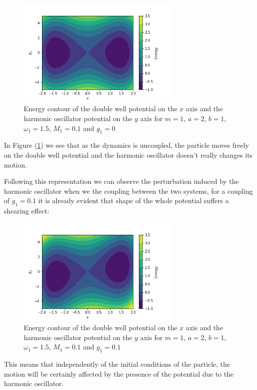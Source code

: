 \begin{figure}[H]
\centering
\includegraphics[width=0.7\textwidth]{Figures/energy_contour.png}
\caption{Energy contour of the double well potential on the $x$ axis and the harmonic oscillator potential on the $y$ axis for $m=1$, $a=2$, $b=1$, $\omega_1=1.5$, $M_1=0.1$ and $g_1=0$}
\label{fig:contour_g0}
\end{figure}

In Figure (\ref{fig:contour_g0}) we see that as the dynamics is uncoupled, the particle moves freely on the double well potential and the harmonic oscillator doesn't really changes its motion. \par 

Following this representation we can observe the perturbation induced by the harmonic oscillator when we  the coupling between the two systems, for a coupling of $g_1=0.1$ it is already evident that shape of the whole potential suffers a shearing effect:

\begin{figure}[H]
\centering
\includegraphics[width=0.7\textwidth]{Figures/energy_contour_coupled01.png}
\caption{Energy contour of the double well potential on the $x$ axis and the harmonic oscillator potential on the $y$ axis for $m=1$, $a=2$, $b=1$, $\omega_1=1.5$, $M_1=0.1$ and $g_1=0.1$\label{fig:contour_g01}}

\end{figure}
This means that independently of the initial conditions of the particle, the motion will be certainly affected by the presence of the potential due to the harmonic oscillator.\par 

